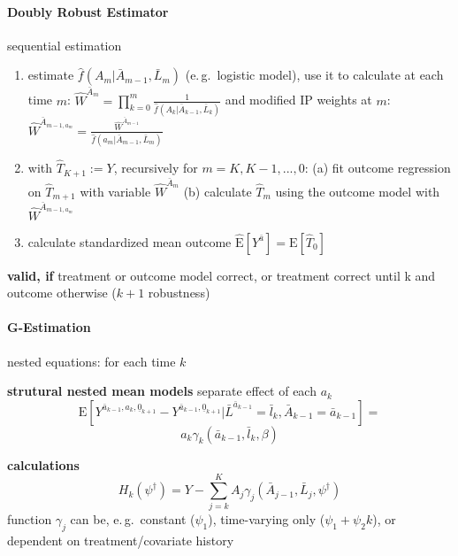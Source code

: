 \documentclass[8pt,oneside]{extarticle}
\begin{document}
\begin{multicols}{2}
\paragraph{\large Doubly Robust Estimator} sequential estimation
\begin{enumerate}[leftmargin=*, itemsep=0em, topsep=0pt, partopsep=0pt,parsep=0pt]
\setlength{\itemsep}{0pt}%
\setlength{\parskip}{0pt}
\item 
estimate $\hat{f}\left(A_m|\bar{A}_{m-1}, \bar{L}_m\right)$ (e.\,g.\ logistic model), use it to \newline
calculate at each time $m$: $\widehat{W}^{\bar{A}_m} = \prod_{k=0}^m\frac{1}{\hat{f}\left(A_k|\bar{A}_{k-1}, \bar{L}_k\right)}$ and modified IP weights at $m$: $\widehat{W}^{\bar{A}_{m-1, a_m}} = \frac{\widehat{W}^{\bar{A}_{m-1}}}{\hat{f}\left(a_m|\bar{A}_{m-1}, \bar{L}_m\right)} $
\item with $\widehat{T}_{K+1}:=Y$, recursively for $m=K, K-1, ..., 0$:\newline
 (a) fit outcome regression on $\widehat{T}_{m+1}$ with variable  $\widehat{W}^{\bar{A}_m}$\newline
 (b) calculate $\widehat{T}_{m}$ using the outcome model with $\widehat{W}^{\bar{A}_{m-1, a_m}}$
\item calculate standardized mean outcome $\widehat{\mathrm{E}}\left[Y^{\bar{a}}\right] = \mathrm{E}\left[\widehat{T}_0\right]$
\end{enumerate}

\noindent \textbf{valid, if} treatment or outcome model correct, or treatment correct until k and outcome otherwise ($k+1$ robustness)


\paragraph{\large G-Estimation} nested equations: for each time $k$

\noindent \textbf{strutural nested mean models} separate effect of each $a_k$
$$\mathrm{E}\left[Y^{\bar{a}_{k-1}, a_k, \underline{0}_{k+1}} - Y^{\bar{a}_{k-1}, \underline{0}_{k+1}}|\bar{L}^{\bar{a}_{k-1}}=\bar{l}_k, \bar{A}_{k-1} = \bar{a}_{k-1}\right] = $$
$$  a_k\gamma_k\left(\bar{a}_{k-1}, \bar{l}_k,\beta\right)$$
\noindent 

\noindent \textbf{calculations}
$$H_k\left(\psi^\dagger\right) = Y - \sum_{j=k}^K A_j \gamma_j\left(\bar{A}_{j-1}, \bar{L}_j, \psi^\dagger\right)$$
\noindent function $\gamma_j$ can be, e.\,g.\ constant ($\psi_1$), time-varying only ($\psi_1+\psi_2k$), or dependent on treatment/covariate history


\end{multicols}
\end{document}
